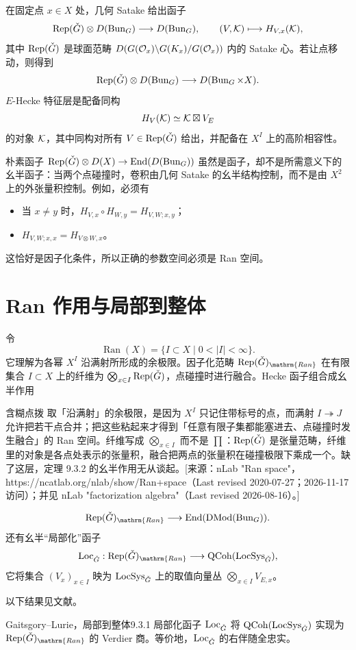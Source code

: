 在固定点 $x\in X$ 处，几何 Satake 给出函子
\[\operatorname{Rep}(\check{G})\otimes D(\operatorname{Bun}_G)\longrightarrow D(\operatorname{Bun}_G),\qquad(V,\mathcal{K})\longmapsto H_{V,x}(\mathcal{K}),\]
其中 $\operatorname{Rep}(\check{G})$ 是球面范畴 $D(G(\mathcal{O}_x)\backslash G(K_x)/G(\mathcal{O}_x))$ 内的 Satake 心。若让点移动，则得到
\[\operatorname{Rep}(\check{G})\otimes D(\operatorname{Bun}_G)\longrightarrow D(\operatorname{Bun}_G\times X).\]
$E$-Hecke 特征层是配备同构
\[H_V(\mathcal{K})\simeq\mathcal{K}\boxtimes V_E\]
的对象 $\mathcal{K}$，其中同构对所有 $V\in\operatorname{Rep}(\check{G})$ 给出，并配备在 $X^I$ 上的高阶相容性。

朴素函子 $\operatorname{Rep}(\check{G})\otimes D(X)\to\operatorname{End}(D(\operatorname{Bun}_G))$ 虽然是函子，却不是所需意义下的幺半函子：当两个点碰撞时，卷积由几何 Satake 的幺半结构控制，而不是由 $X^2$ 上的外张量积控制。例如，必须有
\begin{itemize}
\item 当 $x\ne y$ 时，$H_{V,x}\circ H_{W,y}=H_{V,W;x,y}$；
\item $H_{V,W;x,x}=H_{V\otimes W,x}$。
\end{itemize}
这恰好是因子化条件，所以正确的参数空间必须是 Ran 空间。
\section{Ran 作用与局部到整体}\label{sec:9.3}
令
\[\operatorname{Ran}(X)=\{I\subset X\mid0<|I|<\infty\}.\]
它理解为各幂 $X^I$ 沿满射所形成的余极限。因子化范畴 $\Rep(\checkG)_{\mathrm{Ran}}$ 在有限集合 $I\subset X$ 上的纤维为 $\bigotimes_{x\in I}\operatorname{Rep}(\check{G})$，点碰撞时进行融合。Hecke 函子组合成幺半作用

\begin{transnote}{含糊点拨}
取「沿满射」的余极限，是因为 $X^I$ 只记住带标号的点，而满射 $I\twoheadrightarrow J$ 允许把若干点合并；把这些粘起来才得到「任意有限子集都能塞进去、点碰撞时发生融合」的 Ran 空间。纤维写成 $\bigotimes_{x\in I}$ 而不是 $\prod$：$\operatorname{Rep}(\check G)$ 是张量范畴，纤维里的对象是各点处表示的张量积，融合把两点的张量积在碰撞极限下乘成一个。缺了这层，定理 9.3.2 的幺半作用无从谈起。[来源：nLab "Ran space"，https://ncatlab.org/nlab/show/Ran+space（Last revised 2020-07-27；2026-11-17 访问）；并见 nLab "factorization algebra"（Last revised 2026-08-16）。]
\end{transnote}
\[\Rep(\checkG)_{\mathrm{Ran}}\longrightarrow\End(\DMod(\Bun_G)).\]
还有幺半“局部化”函子
\[\operatorname{Loc}_{\checkG}:\Rep(\checkG)_{\mathrm{Ran}}\longrightarrow\QCoh(\LocSys_{\checkG}),\]
它将集合 $(V_x)_{x\in I}$ 映为 $\operatorname{LocSys}_{\check{G}}$ 上的取值向量丛 $\bigotimes_{x\in I}V_{E,x}$。

以下结果见文献\cite{Gai10}。
\begin{theorem}{Gaitsgory–Lurie，局部到整体}{9.3.1}
局部化函子 $\operatorname{Loc}_{\check{G}}$ 将 $\operatorname{QCoh}(\operatorname{LocSys}_{\check{G}})$ 实现为 $\Rep(\checkG)_{\mathrm{Ran}}$ 的 Verdier 商。等价地，$\operatorname{Loc}_{\check{G}}$ 的右伴随全忠实。
\end{theorem}

